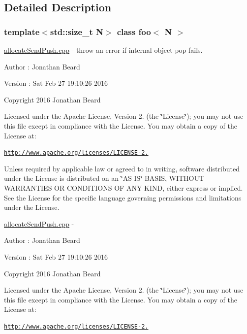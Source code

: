 \subsection{Detailed Description}
\subsubsection*{template$<$std\+::size\+\_\+t N$>$\newline
class foo$<$ N $>$}

\hyperlink{allocate_send_push_8cpp_source}{allocate\+Send\+Push.\+cpp} -\/ throw an error if internal object pop fails.

\begin{DoxyAuthor}{Author}
\+: Jonathan Beard 
\end{DoxyAuthor}
\begin{DoxyVersion}{Version}
\+: Sat Feb 27 19\+:10\+:26 2016
\end{DoxyVersion}
Copyright 2016 Jonathan Beard

Licensed under the Apache License, Version 2. (the \char`\"{}\+License\char`\"{}); you may not use this file except in compliance with the License. You may obtain a copy of the License at\+:

\href{http://www.apache.org/licenses/LICENSE-2.0}{\tt http\+://www.\+apache.\+org/licenses/\+L\+I\+C\+E\+N\+S\+E-\/2.}

Unless required by applicable law or agreed to in writing, software distributed under the License is distributed on an \char`\"{}\+A\+S I\+S\char`\"{} B\+A\+S\+IS, W\+I\+T\+H\+O\+UT W\+A\+R\+R\+A\+N\+T\+I\+ES OR C\+O\+N\+D\+I\+T\+I\+O\+NS OF A\+NY K\+I\+ND, either express or implied. See the License for the specific language governing permissions and limitations under the License.

\hyperlink{allocate_send_push_8cpp_source}{allocate\+Send\+Push.\+cpp} -\/ \begin{DoxyAuthor}{Author}
\+: Jonathan Beard 
\end{DoxyAuthor}
\begin{DoxyVersion}{Version}
\+: Sat Feb 27 19\+:10\+:26 2016
\end{DoxyVersion}
Copyright 2016 Jonathan Beard

Licensed under the Apache License, Version 2. (the \char`\"{}\+License\char`\"{}); you may not use this file except in compliance with the License. You may obtain a copy of the License at\+:

\href{http://www.apache.org/licenses/LICENSE-2.0}{\tt http\+://www.\+apache.\+org/licenses/\+L\+I\+C\+E\+N\+S\+E-\/2.}

